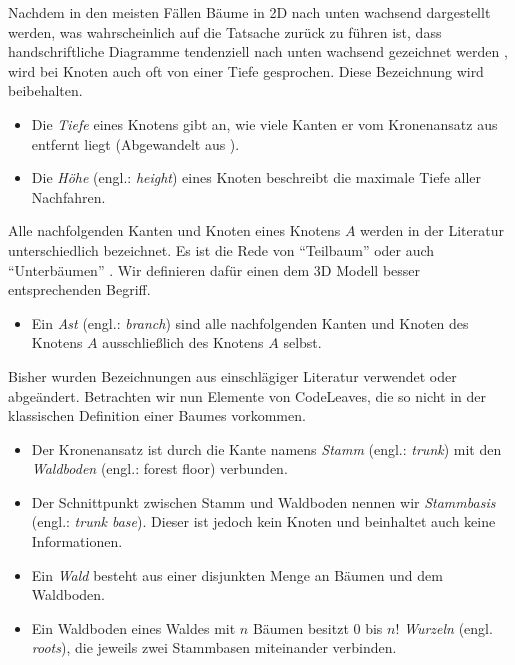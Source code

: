 Nachdem in den meisten Fällen Bäume in 2D nach unten wachsend dargestellt werden, was wahrscheinlich auf die Tatsache zurück zu führen ist, dass handschriftliche Diagramme tendenziell nach unten wachsend gezeichnet werden \cite{knuth1973fundamental}, wird bei Knoten auch oft von einer Tiefe gesprochen. Diese Bezeichnung wird beibehalten.

\begin{itemize}
  \item Die \textit{Tiefe} eines Knotens gibt an, wie viele Kanten er vom Kronenansatz aus entfernt liegt (Abgewandelt aus \cite{ernst2016grundkurs}).
  \item Die \textit{Höhe} (engl.: \textit{height}) eines Knoten beschreibt die maximale Tiefe aller Nachfahren.
\end{itemize}

Alle nachfolgenden Kanten und Knoten eines Knotens $A$ werden in der Literatur unterschiedlich bezeichnet. Es ist die Rede von "`Teilbaum"' \cite{ernst2016grundkurs} oder auch "`Unterbäumen"' \cite{gumm2009einfuehrung}. Wir definieren dafür einen dem 3D Modell besser entsprechenden Begriff.

\begin{itemize}
  \item Ein \textit{Ast} (engl.: \textit{branch}) sind alle nachfolgenden Kanten und Knoten des Knotens $A$ ausschließlich des Knotens $A$ selbst.
\end{itemize}

Bisher wurden Bezeichnungen aus einschlägiger Literatur verwendet oder abgeändert. Betrachten wir nun Elemente von CodeLeaves, die so nicht in der klassischen Definition einer Baumes vorkommen.

\begin{itemize}
  \item Der Kronenansatz ist durch die Kante namens \textit{Stamm} (engl.: \textit{trunk}) mit den \textit{Waldboden} (engl.: forest floor) verbunden.
  \item Der Schnittpunkt zwischen Stamm und Waldboden nennen wir \textit{Stammbasis} (engl.: \textit{trunk base}). Dieser ist jedoch kein Knoten und beinhaltet auch keine Informationen.
  \item Ein \textit{Wald} besteht aus einer disjunkten Menge an Bäumen und dem Waldboden.
  \item Ein Waldboden eines Waldes mit $n$ Bäumen besitzt $0$ bis $n!$ \textit{Wurzeln} (engl. \textit{roots}), die jeweils zwei Stammbasen miteinander verbinden.
\end{itemize}

